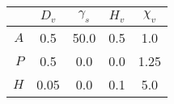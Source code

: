 \begin{tabular}{r|cccc}
 & $D_v$ & $\gamma_s$ & $H_v$ & $\chi_v$ \\
\hline$A$& 0.5 & 50.0 & 0.5 & 1.0\\
$P$& 0.5 & 0.0 & 0.0 & 1.25\\
$H$& 0.05 & 0.0 & 0.1 & 5.0\\
\end{tabular}
